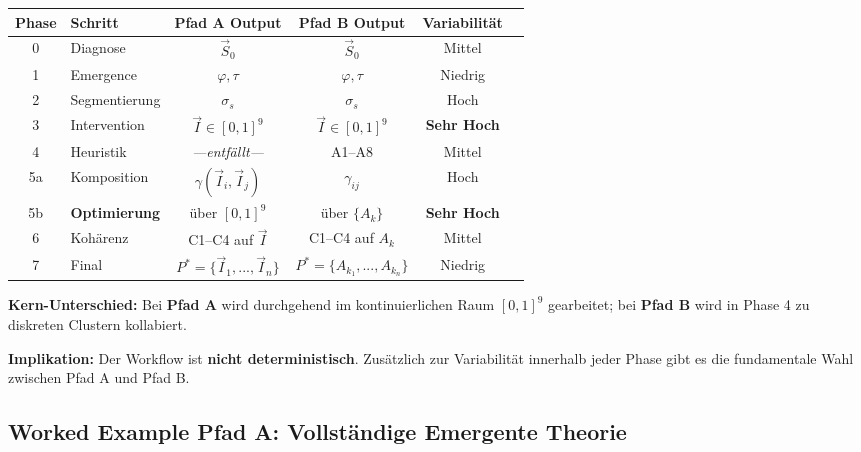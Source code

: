 \begin{tcolorbox}[colback=green!5!white, colframe=green!75!black,
    title=\textbf{Pfad A (Emergente Theorie) vs.\ Pfad B (Heuristik)}]

\begin{center}
\renewcommand{\arraystretch}{1.4}
\footnotesize
\begin{tabular}{@{}clcccc@{}}
\toprule
\textbf{Phase} & \textbf{Schritt} & \textbf{Pfad A Output} & \textbf{Pfad B Output} & \textbf{Variabilität} \\
\midrule
0 & Diagnose & $\vec{S}_0$ & $\vec{S}_0$ & Mittel \\
1 & Emergence & $\varphi, \tau$ & $\varphi, \tau$ & Niedrig \\
2 & Segmentierung & $\sigma_s$ & $\sigma_s$ & Hoch \\
3 & Intervention & $\vec{I} \in [0,1]^9$ & $\vec{I} \in [0,1]^9$ & \textbf{Sehr Hoch} \\
\rowcolor{gray!20} 4 & Heuristik & \textit{---entfällt---} & A1--A8 & Mittel \\
5a & Komposition & $\gamma(\vec{I}_i, \vec{I}_j)$ & $\gamma_{ij}$ & Hoch \\
\rowcolor{red!10} 5b & \textbf{Optimierung} & über $[0,1]^9$ & über $\{A_k\}$ & \textbf{Sehr Hoch} \\
6 & Kohärenz & C1--C4 auf $\vec{I}$ & C1--C4 auf $A_k$ & Mittel \\
7 & Final & $P^* = \{\vec{I}_1, ..., \vec{I}_n\}$ & $P^* = \{A_{k_1}, ..., A_{k_n}\}$ & Niedrig \\
\bottomrule
\end{tabular}
\end{center}

\textbf{Kern-Unterschied:} Bei \textbf{Pfad A} wird durchgehend im kontinuierlichen Raum $[0,1]^9$ gearbeitet; bei \textbf{Pfad B} wird in Phase 4 zu diskreten Clustern kollabiert.

\textbf{Implikation:} Der Workflow ist \textbf{nicht deterministisch}. Zusätzlich zur Variabilität innerhalb jeder Phase gibt es die fundamentale Wahl zwischen Pfad A und Pfad B.

\end{tcolorbox}

\subsection{Worked Example Pfad A: Vollständige Emergente Theorie}
\label{sec:20-workflow-example-A}

